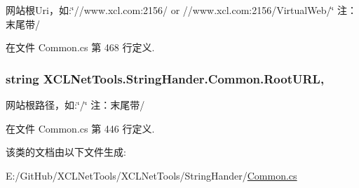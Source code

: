 网站根\+Uri，如\+:\char`\"{}//www.\+xcl.\+com\+:2156/ or //www.\+xcl.\+com\+:2156/\+Virtual\+Web/\char`\"{} 注：末尾带\textquotesingle{}/\textquotesingle{} 



在文件 Common.\+cs 第 468 行定义.

\subsubsection[{\texorpdfstring{Root\+U\+RL}{RootURL}}]{\setlength{\rightskip}{0pt plus 5cm}string X\+C\+L\+Net\+Tools.\+String\+Hander.\+Common.\+Root\+U\+RL\hspace{0.3cm}{\ttfamily [static]}, {\ttfamily [get]}}\hypertarget{class_x_c_l_net_tools_1_1_string_hander_1_1_common_a87e9775b7bdaaf9bc205a148b1335ee2}{}\label{class_x_c_l_net_tools_1_1_string_hander_1_1_common_a87e9775b7bdaaf9bc205a148b1335ee2}


网站根路径，如\+:\char`\"{}/\char`\"{} 注：末尾带\textquotesingle{}/\textquotesingle{} 



在文件 Common.\+cs 第 446 行定义.



该类的文档由以下文件生成\+:\begin{DoxyCompactItemize}
\item 
E\+:/\+Git\+Hub/\+X\+C\+L\+Net\+Tools/\+X\+C\+L\+Net\+Tools/\+String\+Hander/\hyperlink{_common_8cs}{Common.\+cs}\end{DoxyCompactItemize}
